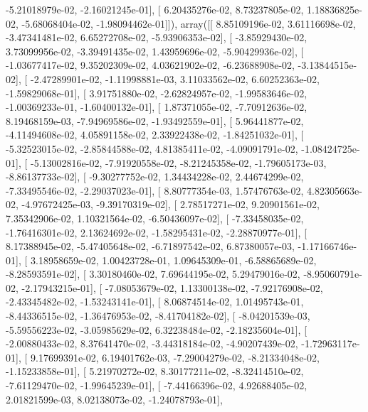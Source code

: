 \documentclass{article}
\begin{document}
         -5.21018979e-02,  -2.16021245e-01],
       [  6.20435276e-02,   8.73237805e-02,   1.18836825e-02,
         -5.68068404e-02,  -1.98094462e-01]]), array([[  8.85109196e-02,   3.61116698e-02,  -3.47341481e-02,
          6.65272708e-02,  -5.93906353e-02],
       [ -3.85929430e-02,   3.73099956e-02,  -3.39491435e-02,
          1.43959696e-02,  -5.90429936e-02],
       [ -1.03677417e-02,   9.35202309e-02,   4.03621902e-02,
         -6.23688908e-02,  -3.13844515e-02],
       [ -2.47289901e-02,  -1.11998881e-03,   3.11033562e-02,
          6.60252363e-02,  -1.59829068e-01],
       [  3.91751880e-02,  -2.62824957e-02,  -1.99583646e-02,
         -1.00369233e-01,  -1.60400132e-01],
       [  1.87371055e-02,  -7.70912636e-02,   8.19468159e-03,
         -7.94969586e-02,  -1.93492559e-01],
       [  5.96441877e-02,  -4.11494608e-02,   4.05891158e-02,
          2.33922438e-02,  -1.84251032e-01],
       [ -5.32523015e-02,  -2.85844588e-02,   4.81385411e-02,
         -4.09091791e-02,  -1.08424725e-01],
       [ -5.13002816e-02,  -7.91920558e-02,  -8.21245358e-02,
         -1.79605173e-03,  -8.86137733e-02],
       [ -9.30277752e-02,   1.34434228e-02,   2.44674299e-02,
         -7.33495546e-02,  -2.29037023e-01],
       [  8.80777354e-03,   1.57476763e-02,   4.82305663e-02,
         -4.97672425e-03,  -9.39170319e-02],
       [  2.78517271e-02,   9.20901561e-02,   7.35342906e-02,
          1.10321564e-02,  -6.50436097e-02],
       [ -7.33458035e-02,  -1.76416301e-02,   2.13624692e-02,
         -1.58295431e-02,  -2.28870977e-01],
       [  8.17388945e-02,  -5.47405648e-02,  -6.71897542e-02,
          6.87380057e-03,  -1.17166746e-01],
       [  3.18958659e-02,   1.00423728e-01,   1.09645309e-01,
         -6.58865689e-02,  -8.28593591e-02],
       [  3.30180460e-02,   7.69644195e-02,   5.29479016e-02,
         -8.95060791e-02,  -2.17943215e-01],
       [ -7.08053679e-02,   1.13300138e-02,  -7.92176908e-02,
         -2.43345482e-02,  -1.53243141e-01],
       [  8.06874514e-02,   1.01495743e-01,  -8.44336515e-02,
         -1.36476953e-02,  -8.41704182e-02],
       [ -8.04201539e-03,  -5.59556223e-02,  -3.05985629e-02,
          6.32238484e-02,  -2.18235604e-01],
       [ -2.00880433e-02,   8.37641470e-02,  -3.44318184e-02,
         -4.90207439e-02,  -1.72963117e-01],
       [  9.17699391e-02,   6.19401762e-03,  -7.29004279e-02,
         -8.21334048e-02,  -1.15233858e-01],
       [  5.21970272e-02,   8.30177211e-02,  -8.32414510e-02,
         -7.61129470e-02,  -1.99645239e-01],
       [ -7.44166396e-02,   4.92688405e-02,   2.01821599e-03,
          8.02138073e-02,  -1.24078793e-01],
\end{document}
